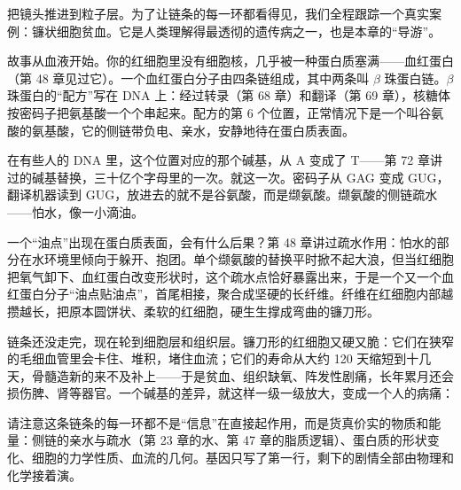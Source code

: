 把镜头推进到粒子层。为了让链条的每一环都看得见，我们全程跟踪一个真实案例：镰状细胞贫血。它是人类理解得最透彻的遗传病之一，也是本章的“导游”。

故事从血液开始。你的红细胞里没有细胞核，几乎被一种蛋白质塞满——血红蛋白（第 48 章见过它）。一个血红蛋白分子由四条链组成，其中两条叫 $\beta$ 珠蛋白链。$\beta$ 珠蛋白的“配方”写在 DNA 上：经过转录（第 68 章）和翻译（第 69 章），核糖体按密码子把氨基酸一个个串起来。配方的第 6 个位置，正常情况下是一个叫谷氨酸的氨基酸，它的侧链带负电、亲水，安静地待在蛋白质表面。

在有些人的 DNA 里，这个位置对应的那个碱基，从 A 变成了 T——第 72 章讲过的碱基替换，三十亿个字母里的一次。就这一次。密码子从 GAG 变成 GUG，翻译机器读到 GUG，放进去的就不是谷氨酸，而是缬氨酸。缬氨酸的侧链疏水——怕水，像一小滴油。

一个“油点”出现在蛋白质表面，会有什么后果？第 48 章讲过疏水作用：怕水的部分在水环境里倾向于躲开、抱团。单个缬氨酸的替换平时掀不起大浪，但当红细胞把氧气卸下、血红蛋白改变形状时，这个疏水点恰好暴露出来，于是一个又一个血红蛋白分子“油点贴油点”，首尾相接，聚合成坚硬的长纤维。纤维在红细胞内部越攒越长，把原本圆饼状、柔软的红细胞，硬生生撑成弯曲的镰刀形。

链条还没走完，现在轮到细胞层和组织层。镰刀形的红细胞又硬又脆：它们在狭窄的毛细血管里会卡住、堆积，堵住血流；它们的寿命从大约 120 天缩短到十几天，骨髓造新的来不及补上——于是贫血、组织缺氧、阵发性剧痛，长年累月还会损伤脾、肾等器官。一个碱基的差异，就这样一级一级放大，变成一个人的病痛：

\begin{center}
\end{center}

请注意这条链条的每一环都不是“信息”在直接起作用，而是货真价实的物质和能量：侧链的亲水与疏水（第 23 章的水、第 47 章的脂质逻辑）、蛋白质的形状变化、细胞的力学性质、血流的几何。基因只写了第一行，剩下的剧情全部由物理和化学接着演。

